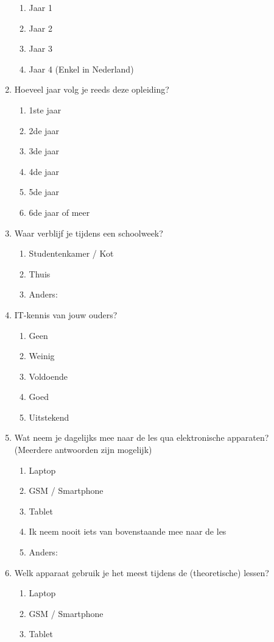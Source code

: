 \begin{enumerate}
\begin{enumerate}
		\item Jaar 1
		\item Jaar 2
		\item Jaar 3
		\item Jaar 4 (Enkel in Nederland)
	\end{enumerate}
	\item Hoeveel jaar volg je reeds deze opleiding?
	\begin{enumerate}
		\item 1ste jaar
		\item 2de jaar
		\item 3de jaar
		\item 4de jaar
		\item 5de jaar
		\item 6de jaar of meer
	\end{enumerate}
	\item Waar verblijf je tijdens een schoolweek?
	\begin{enumerate}
		\item Studentenkamer / Kot 
		\item Thuis
		\item Anders:
	\end{enumerate}
	\item IT-kennis van jouw ouders?
	\begin{enumerate}
		\item Geen
		\item Weinig
		\item Voldoende
		\item Goed
		\item Uitstekend
	\end{enumerate}
	\item Wat neem je dagelijks mee naar de les qua elektronische apparaten? (Meerdere antwoorden zijn mogelijk)
	\begin{enumerate}
		\item Laptop
		\item GSM / Smartphone
		\item Tablet
		\item Ik neem nooit iets van bovenstaande mee naar de les
		\item Anders:
	\end{enumerate}
	\item Welk apparaat gebruik je het meest tijdens de (theoretische) lessen?
	\begin{enumerate}
		\item Laptop
		\item GSM / Smartphone
		\item Tablet

\end{enumerate}
\end{enumerate}
